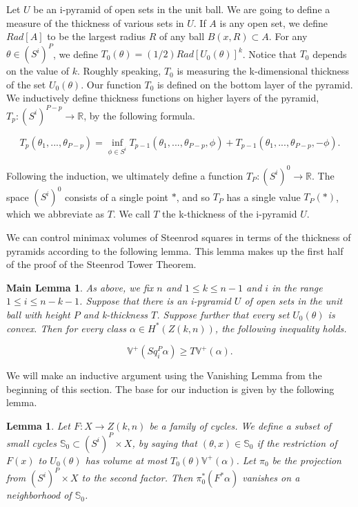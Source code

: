 \documentclass{amsart}
\newtheorem*{Theorem 1}{Theorem 1}
\newtheorem*{Theorem 2}{Theorem 2}
\newtheorem*{Theorem 1A}{Theorem 1A}
\newtheorem*{Theorem 2A}{Theorem 2A}
\newtheorem{ML}{Main Lemma}
\newtheorem{lemma}{Lemma}[section]
\newtheorem*{vanishing lemma}{Vanishing Lemma}
\numberwithin{equation}{section}
\begin{document}
Let $U$ be an i-pyramid of open sets in the unit ball.  We are going
to define a measure of the thickness of various sets in $U$.  
If $A$ is any open set, we define $Rad[A]$ to be the
largest radius $R$ of any ball $B(x, R) \subset A$.  For any
$\theta \in (S^i)^P$, we define $T_0(\theta) = (1/2) Rad[U_0(\theta)]^k$.
Notice that $T_0$ depends on the value of $k$.  Roughly speaking, $T_0$
is measuring the k-dimensional thickness of the set $U_0(\theta)$.
Our function $T_0$ is defined on the bottom layer
of the pyramid.  We inductively define thickness functions on higher
layers of the pyramid, $T_p: (S^i)^{P-p} \rightarrow \mathbb{R}$,
by the following formula.

$$T_p(\theta_1, ..., \theta_{P-p}) = \inf_{\phi \in S^i}
T_{p-1}(\theta_1, ..., \theta_{P-p}, \phi) + T_{p-1}(\theta_1,
..., \theta_{P-p}, - \phi).$$

\noindent Following the induction, we ultimately define a function
$T_P: (S^i)^0 \rightarrow \mathbb{R}$.  The space $(S^i)^0$ consists
of a single point $*$, and so $T_P$ has a single value $T_P(*)$, 
which we abbreviate as $T$.  We call $T$ the k-thickness of the i-pyramid
$U$.

We can control minimax volumes of Steenrod squares in terms of the
thickness of pyramids according to the following lemma.  This lemma
makes up the first half of the proof of the Steenrod Tower Theorem.

\begin{ML} As above, we fix $n$ and $1 \le k \le n-1$ and $i$ in the range
$1 \le i \le n-k-1$.  Suppose that there is an i-pyramid $U$ of open
sets in the unit ball with height $P$ and k-thickness $T$.  Suppose further
that every set $U_0(\theta)$ is convex.
Then for
every class $\alpha \in H^*(Z(k,n))$, the following inequality holds.

$$\mathbb{V}^+(Sq_i^P \alpha) \ge T \mathbb{V}^+(\alpha).$$
\end{ML}

\proof We will make an inductive argument using the Vanishing Lemma
from the beginning of this section.  The base for our induction
is given by the following lemma.

\begin{lemma} Let $F: X \rightarrow Z(k,n)$ be a family of cycles.  
We define a subset of small cycles $\mathbb{S}_0
\subset (S^i)^P \times X$, by saying that $(\theta, x) \in \mathbb{S}_0$ if
the restriction of $F(x)$ to $U_0(\theta)$ has volume at 
most $T_0(\theta) \mathbb{V}^+(\alpha)$.  Let
$\pi_0$ be the projection from $(S^i)^P \times X$ to the second factor.  Then
$\pi_0^* (F^* \alpha)$ vanishes on a neighborhood of $\mathbb{S}_0$.
\end{lemma}
\end{document}

